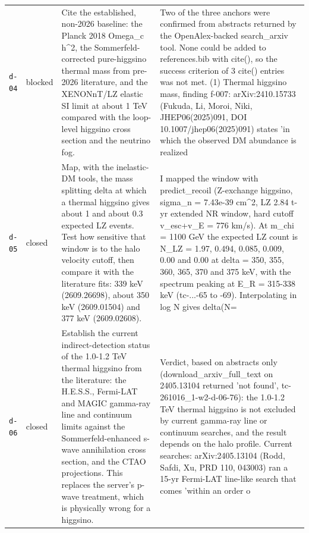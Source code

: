 \documentclass[11pt,a4paper]{article}
\begin{document}
\begin{longtable}{@{}p{}p{}p{}p{}@{}}
\texttt{d-04} & blocked & Cite the established, non-2026 baseline: the Planck 2018 Omega\_c h\textasciicircum{}2, the Sommerfeld-corrected pure-higgsino thermal mass from pre-2026 literature, and the XENONnT/LZ elastic SI limit at about 1 TeV compared with the loop-level higgsino cross section and the neutrino fog. & Two of the three anchors were confirmed from abstracts returned by the OpenAlex-backed search\_arxiv tool. None could be added to references.bib with cite(), so the success criterion of 3 cite() entries was not met. (1) Thermal higgsino mass, finding f-007: arXiv:2410.15733 (Fukuda, Li, Moroi, Niki, JHEP06(2025)091, DOI 10.1007/jhep06(2025)091) states 'in which the observed DM abundance is realized \\
\texttt{d-05} & closed & Map, with the inelastic-DM tools, the mass splitting delta at which a thermal higgsino gives about 1 and about 0.3 expected LZ events. Test how sensitive that window is to the halo velocity cutoff, then compare it with the literature fits: 339 keV (2609.26698), about 350 keV (2609.01504) and 377 keV (2609.02608). & I mapped the window with predict\_recoil (Z-exchange higgsino, sigma\_n = 7.43e-39 cm\textasciicircum{}2, LZ 2.84 t-yr extended NR window, hard cutoff v\_esc+v\_E = 776 km/s). At m\_chi = 1100 GeV the expected LZ count is N\_LZ = 1.97, 0.494, 0.085, 0.009, 0.00 and 0.00 at delta = 350, 355, 360, 365, 370 and 375 keV, with the spectrum peaking at E\_R = 315-338 keV (tc-...-65 to -69). Interpolating in log N gives delta(N= \\
\texttt{d-06} & closed & Establish the current indirect-detection status of the 1.0-1.2 TeV thermal higgsino from the literature: the H.E.S.S., Fermi-LAT and MAGIC gamma-ray line and continuum limits against the Sommerfeld-enhanced s-wave annihilation cross section, and the CTAO projections. This replaces the server's p-wave treatment, which is physically wrong for a higgsino. & Verdict, based on abstracts only (download\_arxiv\_full\_text on 2405.13104 returned 'not found', tc-261016\_1-w2-d-06-76): the 1.0-1.2 TeV thermal higgsino is not excluded by current gamma-ray line or continuum searches, and the result depends on the halo profile. Current searches: arXiv:2405.13104 (Rodd, Safdi, Xu, PRD 110, 043003) ran a 15-yr Fermi-LAT line-like search that comes 'within an order o \\
\bottomrule\end{longtable}
\end{document}
